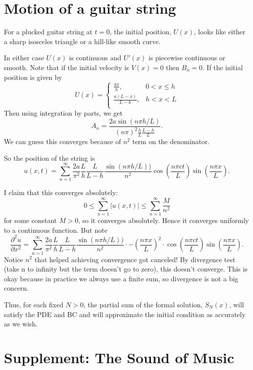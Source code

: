 \documentclass[class=article,crop=false]{standalone}
\begin{document}
\newpage
\section{Motion of a guitar string}

For a plucked guitar string at $ t=0$, the initial position, $ U(x)$, looks like either a sharp isosceles triangle or a hill-like smooth curve.

In either case  $ U(x)$ is continuous and  $ U'(x)$ is piecewise continuous or smooth. Note that if the initial velocity is  $ V(x)=0$ then  $ B_n=0$. If the initial position is given by
\begin{equation*}
	U(x)=
\begin{cases}
	\frac{ax}{h}, &0<x\leq h\\
	\frac{a(L-x)}{L-h }, & h<x<L\\
\end{cases}
\end{equation*}
Then using integration by parts, we get
\[
	A_n = \frac{2a \sin(n\pi h /L)}{(n\pi)^2 \frac{h}{L} \frac{L-h}{L }}
.\] 
We can guess this converges because of $ n^2$ term on the denominator.

So the position of the string is
\[
	u(x,t) = \sum_{ n= 1}^{\infty} \frac{2a}{\pi^2} \frac{L}{h} \frac{L}{L-h} \frac{\sin(n \pi h /L)  )}{n^2 } \cos \left( \frac{n\pi ct}{L } \right) \sin \left( \frac{ n\pi x}{ L} \right) 
.\]

I claim that this converges absolutely:
\[
	0\leq \sum_{ n= 1}^{\infty} | u(x,t)| \leq \sum_{ n= 1}^{\infty} \frac{M}{n^2}
\]
for some constant $ M>0$, so it converges absolutely. Hence it converges uniformly to a continuous function. But note
 \[
	 \frac{\partial^2 u}{\partial { x}^2} = \sum_{ n= 1}^{\infty} \frac{2a}{\pi^2} \frac{L}{h} \frac{L}{L-h} \frac{\sin(n \pi h /L)  )}{n^2 }  \cdot - \left( \frac{n \pi x}{L } \right) ^2 \cdot \cos \left( \frac{ n\pi c t}{ L} \right) \sin \left( \frac{ n\pi x}{ L} \right) 
.\] 
Notice $ n^2$ that helped achieving convergence got canceled! By divergence test (take n to infinity but the term doesn't go to zero), this doesn't converge. This is okay because in practice we always use a finite sum, so divergence is not a big concern.

Thus, for each fixed $ N>0$, the partial sum of the formal solution,  $ S_N(x)$, will satisfy the PDE and BC and will approximate the initial condition as accurately as we wish.

\section{Supplement: The Sound of Music}
\end{document}
